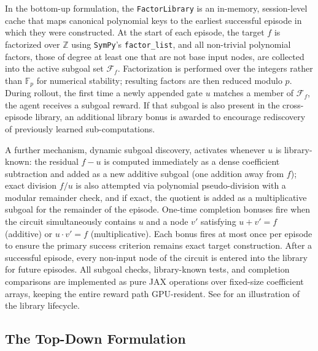 \documentclass{article}
\theoremstyle{definition}
\theoremstyle{remark}
\begin{document}
In the bottom-up formulation, the \texttt{FactorLibrary} is an in-memory, session-level cache that maps canonical polynomial keys to the earliest successful episode in which they were constructed. At the start of each episode, the target $f$ is factorized over $\mathbb{Z}$ using \texttt{SymPy}'s \texttt{factor\_list}, and all non-trivial polynomial factors, those of degree at least one that are not base input nodes, are collected into the active subgoal set $\mathcal{F}_f$. Factorization is performed over the integers rather than $\mathbb{F}_p$ for numerical stability; resulting factors are then reduced modulo $p$. During rollout, the first time a newly appended gate $u$ matches a member of $\mathcal{F}_f$, the agent receives a subgoal reward. If that subgoal is also present in the cross-episode library, an additional library bonus is awarded to encourage rediscovery of previously learned sub-computations.

A further mechanism, dynamic subgoal discovery, activates whenever $u$ is library-known: the residual $f - u$ is computed immediately as a dense coefficient subtraction and added as a new additive subgoal (one addition away from $f$); exact division $f / u$ is also attempted via polynomial pseudo-division with a modular remainder check, and if exact, the quotient is added as a multiplicative subgoal for the remainder of the episode. One-time completion bonuses fire when the circuit simultaneously contains $u$ and a node $v'$ satisfying $u + v' = f$ (additive) or $u \cdot v' = f$ (multiplicative). Each bonus fires at most once per episode to ensure the primary success criterion remains exact target construction. After a successful episode, every non-input node of the circuit is entered into the library for future episodes. All subgoal checks, library-known tests, and completion comparisons are implemented as pure JAX operations over fixed-size coefficient arrays, keeping the entire reward path GPU-resident. See  for an illustration of the library lifecycle.

\subsection{The Top-Down Formulation}

\label{subsec:top-down}
\end{document}
